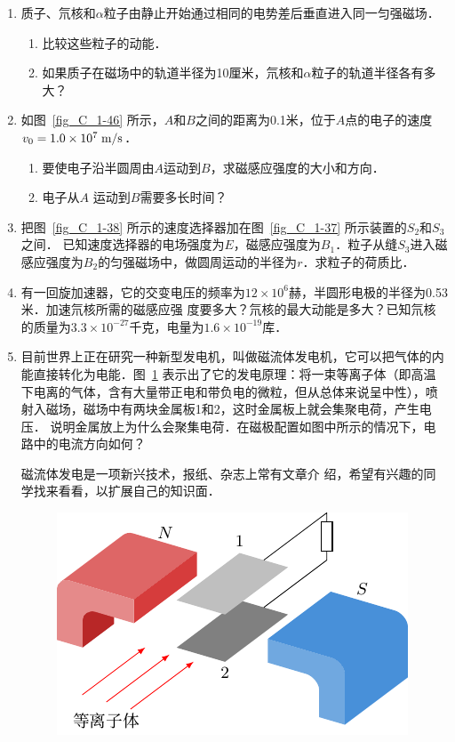 \begin{enumerate}
\item 质子、氘核和$\alpha$粒子由静止开始通过相同的电势差后垂直进入同一匀强磁场．
\begin{enumerate}
    \item 比较这些粒子的动能．
    \item 如果质子在磁场中的轨道半径为10厘米，氘核和$\alpha$粒子的轨道半径各有多大？
\end{enumerate}
\item 如图~\ref{fig_C_1-46} 所示，$A$和$B$之间的距离为0.1米，位于$A$点的电子的速度$v_0=1.0\times10^7\;\text{m}/\text{s}$．
\begin{enumerate}
    \item 要使电子沿半圆周由$A$运动到$B$，求磁感应强度的大小和方向．
    \item 电子从$A$
运动到$B$需要多长时间？
\end{enumerate}
\item 把图~\ref{fig_C_1-38} 所示的速度选择器加在图~\ref{fig_C_1-37} 所示装置的$S_2$和$S_3$之间．
已知速度选择器的电场强度为$E$，磁感应强度为$B_1$．粒子从缝$S_3$进入磁感应强度为$B_2$的匀强磁场中，做圆周运动的半径为$r$．求粒子的荷质比．
\item  有一回旋加速器，它的交变电压的频率为$12\times10^6$赫，半圆形电极的半径为0.53米．加速氘核所需的磁感应强
度要多大？氘核的最大动能是多大？已知氘核的质量为$3.3\times10^{-27}$千克，电量为$1.6\times10^{-19}$库．
\item 目前世界上正在研究一种新型发电机，叫做磁流体发电机，它可以把气体的内能直接转化为电能．图~\ref{fig_C_1-47} 表示出了它的发电原理：将一束等离子体（即高温下电离的气体，含有大量带正电和带负电的微粒，但从总体来说呈中性），喷射入磁场，磁场中有两块金属板1和2，这时金属板上就会集聚电荷，产生电压．
说明金属放上为什么会聚集电荷．在磁极配置如图中所示的情况下，电路中的电流方向如何？

磁流体发电是一项新兴技术，报纸、杂志上常有文章介
绍，希望有兴趣的同学找来看看，以扩展自己的知识面．

\begin{figure}[htbp]
    \centering
    \includegraphics{fig/C/1-47.pdf}
    \caption{}\label{fig_C_1-47}
\end{figure}


\end{enumerate}
